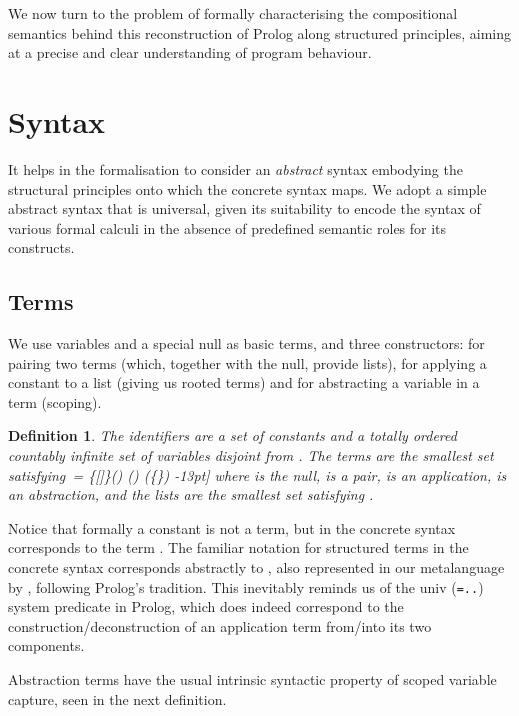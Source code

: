\documentclass{tlp}
\newtheorem{definition}[theorem]{Definition}
\def\LL{\mathcal L}
\def\nil{[]}\def\applsym{\triangleleft}
\begin{document}
We now turn to the problem of formally characterising the
compositional semantics behind this reconstruction of Prolog along
structured principles, aiming at a precise and clear understanding of
program behaviour.

\section{Syntax}

It helps in the formalisation to consider an \emph{abstract} syntax embodying the
structural principles onto which the concrete syntax maps. We adopt a simple
abstract syntax that is universal, given its suitability to encode the syntax of
various formal calculi in the absence of predefined semantic roles for its
constructs.

\subsection{Terms}

  We use variables and a special null as basic terms, and three
constructors: for pairing two terms (which, together with the null, provide
lists), for applying a constant to a list (giving us rooted terms) and for
abstracting a variable in a term (scoping).

\begin{definition}
  The identifiers are a set of \emph{constants}  and a
  totally ordered countably infinite set  of \emph{variables} disjoint from
  .  The \emph{terms} are the smallest set 
  satisfying\
\T = \{\nil\}\cup \V\cup (\T\times \T)
\cup({\C}\times{\LL}) \cup(\{\lambda\}\times{\V}\times{\T})    
  -13pt]
where  is the
\emph{null},  is a \emph{pair},  is an \emph{application},  is an \emph{abstraction}, and the
\emph{lists} are the smallest set 
satisfying .
\end{definition}

Notice that formally a constant  is not a term, but  in the
concrete syntax corresponds to the term . The familiar
notation  for structured
terms in the concrete syntax corresponds abstractly to , also represented in
our metalanguage by , following Prolog's
tradition. This inevitably reminds us of the \textsf{univ} ({\tt=..})
system predicate in Prolog, which does indeed
correspond to the construction/deconstruction of an application term
from/into its two components.

Abstraction terms have the usual intrinsic syntactic property of scoped variable
capture, seen in the next definition.
\end{document}
